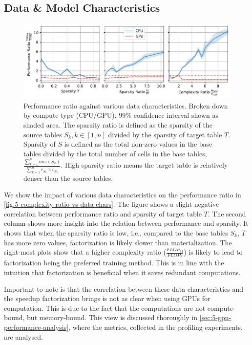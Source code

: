 \subsection{Data \& Model Characteristics}
\begin{figure}[ht]
    \centering
    \includegraphics[width=\linewidth]{chapters/05_cost_estimation/figures/motivation_perf_ratio_vs_data_chars.pdf}
    \caption[Performance ratio for various data characteristics]{Performance ratio against various data characteristics. Broken down by compute type (CPU/GPU). $99\%$ confidence interval shown as shaded area. The sparsity ratio is defined as the sparsity of the source tables $S_k, k\in[1,n]$ divided by the sparsity of target table $T$. Sparsity of $S$ is defined as the total non-zero values in the base tables divided by the total number of cells in the base tables, $\frac{\sum_{k=1}^{n} nnz(S_k)}{\sum_{k=1}^{n} r_{S_k} \times c_{S_k}}$. High sparsity ratio means the target table is relatively denser than the source tables.}
    \label{fig:5-complexity-ratio-vs-data-chars}
\end{figure}
We show the impact of various data characteristics on the performance ratio in \autoref{fig:5-complexity-ratio-vs-data-chars}. The figure shows a slight negative correlation between performance ratio and sparsity of target table $T$. The second column shows more insight into the relation between performance and sparsity. It shows that when the sparsity ratio is low, i.e., compared to the base tables $S_k$, $T$ has more zero values, factorization is likely slower than materialization. The right-most plots show that a higher complexity ratio ($\frac{FLOP_M}{FLOP_F}$) is likely to lead to factorization being the preferred training method. This is in line with the intuition that factorization is beneficial when it saves redundant computations.

Important to note is that the correlation between these data characteristics and the speedup factorization brings is not as clear when using GPUs for computation. This is due to the fact that the computations are not compute-bound, but memory-bound. This view is discussed thoroughly in \autoref{sec:5-gpu-performance-analysis}, where the metrics, collected in the profiling experiments, are analysed.


